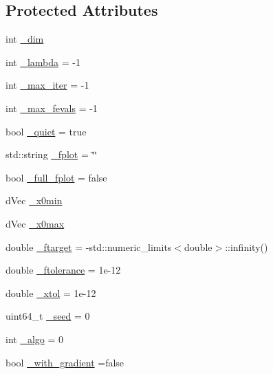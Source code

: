 \subsection*{Protected Attributes}
\begin{DoxyCompactItemize}
\item 
int \hyperlink{classlibcmaes_1_1Parameters_affc62ae5c5f1db4f88e4c2dc96387af6}{\+\_\+dim}
\item 
int \hyperlink{classlibcmaes_1_1Parameters_af732f7206f23cbd6ec2bbd4e217a9a2b}{\+\_\+lambda} = -\/1
\item 
int \hyperlink{classlibcmaes_1_1Parameters_a60abfc730c5aa46e42ebd1598b59caa6}{\+\_\+max\+\_\+iter} = -\/1
\item 
int \hyperlink{classlibcmaes_1_1Parameters_ad316488121bd51f62b28e8183d591c9e}{\+\_\+max\+\_\+fevals} = -\/1
\item 
bool \hyperlink{classlibcmaes_1_1Parameters_a6f6dad55c02a23891e3280cad288295a}{\+\_\+quiet} = true
\item 
std\+::string \hyperlink{classlibcmaes_1_1Parameters_aa49511ea00199348ea94f1aa53fe5bc1}{\+\_\+fplot} = \char`\"{}\char`\"{}
\item 
bool \hyperlink{classlibcmaes_1_1Parameters_a00e08bf1e0de66bd07a1a4d0eb7c925f}{\+\_\+full\+\_\+fplot} = false
\item 
d\+Vec \hyperlink{classlibcmaes_1_1Parameters_aa3bb27467698d9cb7fc7e0a83b48800f}{\+\_\+x0min}
\item 
d\+Vec \hyperlink{classlibcmaes_1_1Parameters_aece9694af9bee78bb13b0994db7ac45e}{\+\_\+x0max}
\item 
double \hyperlink{classlibcmaes_1_1Parameters_a837dbcfba351a043441076a11666f92c}{\+\_\+ftarget} = -\/std\+::numeric\+\_\+limits$<$double$>$\+::infinity()
\item 
double \hyperlink{classlibcmaes_1_1Parameters_ab6c11cc112b5709e9039967e881c808e}{\+\_\+ftolerance} = 1e-\/12
\item 
double \hyperlink{classlibcmaes_1_1Parameters_aaa9e8eedba7d7140d116163b40f653f8}{\+\_\+xtol} = 1e-\/12
\item 
uint64\+\_\+t \hyperlink{classlibcmaes_1_1Parameters_ac6d616c3d5295fec8a0b230592fb767a}{\+\_\+seed} = 0
\item 
int \hyperlink{classlibcmaes_1_1Parameters_a7a5fc681b0c7294ef050ace344f923db}{\+\_\+algo} = 0
\item 
bool \hyperlink{classlibcmaes_1_1Parameters_aff76cebbfef51c20398aab8f49a3676a}{\+\_\+with\+\_\+gradient} =false
\item 

\end{DoxyCompactItemize}
